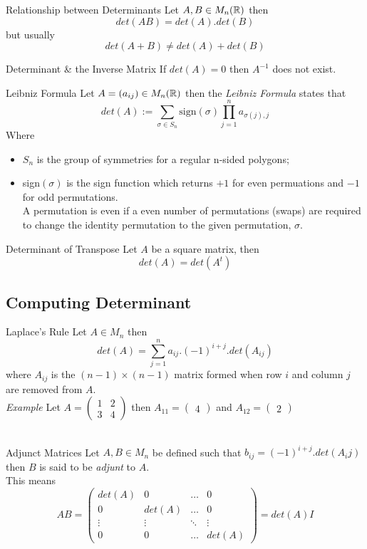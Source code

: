 \documentclass[11pt,a4paper]{article}
\begin{document}
\subtitle{Theorem 6.05 - }{Relationship between Determinants}
Let $A, B \in M_{n}(\mathbb{R})$ then $$det(AB) = det(A).det(B)$$ but usually $$det(A + B) \not = det(A) + det(B)$$

\subtitle{Theorem 6.06 - }{Determinant \& the Inverse Matrix}
If $det(A) = 0$ then $A^{-1}$ does not exist. \\

\subtitle{Theorem 6.07 - }{Leibniz Formula}
Let $A = (a_{ij}) \in M_n(\mathbb{R})$ then the \textit{Leibniz Formula} states that $$det(A) := \sum_{\sigma \in S_n} \mathrm{sign}(\sigma) \prod_{j=1}^{n}a_{\sigma(j),j}$$
Where
\begin{itemize}[label={-}]
  \item $S_n$ is the group of symmetries for a regular n-sided polygons;
  \item sign$(\sigma)$ is the sign function which returns $+1$ for even permuations and $-1$ for odd permutations. \\
  A permutation is even if a even number of permutations (swaps) are required to change the identity permutation to the given permutation, $\sigma$.\\
\end{itemize}

\subtitle{Remark 6.08 - }{Determinant of Transpose}
Let $A$ be a square matrix, then $$det(A) = det(A^t)$$

\subsection{Computing Determinant}

\subtitle{Theorem 6.09 - }{Laplace's Rule}
Let $A \in M_n$ then $$det(A) = \sum_{j=1}^n a_{ij} . (-1)^{i+j} . det(A_{ij})$$ where $A_{ij}$ is the $(n-1) \times (n-1)$ matrix formed when row $i$ and column $j$ are removed from $A$.\\
\textit{Example} Let $A = \begin{pmatrix} 1 & 2 \\ 3 & 4 \end{pmatrix}$ then $A_{11} = \begin{pmatrix} 4 \end{pmatrix}$ and $A_{12} = \begin{pmatrix} 2 \end{pmatrix}$\\\\

\subtitle{Definition 6.10 - }{Adjunct Matrices}
Let $A, B \in M_n$ be defined such that $b_{ij} = (-1)^{i+j} . det(A_ij)$ then $B$ is said to be \textit{adjunt} to $A$. \\
This means
$$AB = \begin{pmatrix} det(A) & 0 & \dots & 0 \\ 0 & det(A) & \dots & 0 \\ \vdots & \vdots & \ddots & \vdots \\ 0 & 0 & \dots & det(A) \end{pmatrix} = det(A)I$$\\
\end{document}
